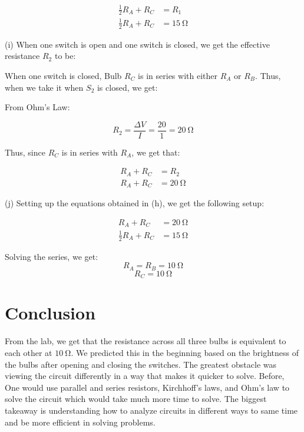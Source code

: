 \documentclass[12pt]{article}
\begin{document}
\begin{equation*}
    \begin{split}
        \frac{1}{2}R_A + R_C & = R_1 \\
        \frac{1}{2}R_A + R_C & = \SI{15}{\ohm}
    \end{split}
\end{equation*}

\bigskip

(i) When one switch is open and one switch is closed, we get the effective resistance $R_2$ to be:

\bigskip

When one switch is closed, Bulb $R_C$ is in series with either $R_A$ or $R_B$. Thus, when we take it when $S_2$ is closed, we get:

\bigskip

From Ohm's Law:

\[R_2 = \frac{\Delta V}{I} = \frac{20}{1} = \SI{20}{\ohm}\]

Thus, since $R_C$ is in series with $R_A$, we get that:

\begin{equation*}
    \begin{split}
        R_A + R_C & = R_2 \\
        R_A + R_C & = \SI{20}{\ohm}
    \end{split}
\end{equation*}

\bigskip

(j) Setting up the equations obtained in (h), we get the following setup:

\begin{equation*}
    \begin{split}
        R_A + R_C & = \SI{20}{\ohm} \\
        \frac{1}{2}R_A + R_C & = \SI{15}{\ohm}
    \end{split}
\end{equation*}

\bigskip

Solving the series, we get:
\[R_A = R_B = \SI{10}{\ohm}\]
\[R_C = \SI{10}{\ohm}\]

\section{Conclusion}
From the lab, we get that the resistance across all three bulbs is equivalent to each other at $\SI{10}{\ohm}$. We predicted this in the beginning based on the brightness of the bulbs after opening and closing the switches. The greatest obstacle was viewing the circuit differently in a way that makes it quicker to solve. Before, One would use parallel and series resistors, Kirchhoff's laws, and Ohm's law to solve the circuit which would take much more time to solve. The biggest takeaway is understanding how to analyze circuits in different ways to same time and be more efficient in solving problems.
\end{document}

